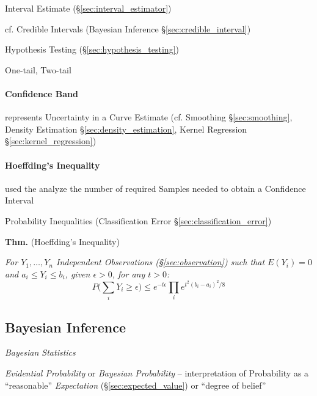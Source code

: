 Interval Estimate (\S\ref{sec:interval_estimator})

cf. Credible Intervals (Bayesian Inference \S\ref{sec:credible_interval})

Hypothesis Testing (\S\ref{sec:hypothesis_testing})

One-tail, Two-tail



\paragraph{Confidence Band}\label{sec:confidence_band}\hfill

represents Uncertainty in a Curve Estimate (cf. Smoothing \S\ref{sec:smoothing},
Density Estimation \S\ref{sec:density_estimation}, Kernel Regression
\S\ref{sec:kernel_regression})



\paragraph{Hoeffding's Inequality}\label{sec:hoeffdings_inequality}\hfill

used the analyze the number of required Samples needed to obtain a Confidence
Interval

\fist Probability Inequalities (Classification Error
\S\ref{sec:classification_error})

\textbf{Thm.} (Hoeffding's Inequality)

\emph{
  For $Y_1, \ldots, Y_n$ Independent Observations (\S\ref{sec:observation}) such
  that $E(Y_i) = 0$ and $a_i \leq Y_i \leq b_i$, given $\epsilon > 0$, for any
  $t > 0$:
  \[
    P\Big(\sum_i Y_i \geq \epsilon\Big) \leq
      e^{-t\epsilon} \prod_i e^{t^2(b_i - a_i)^2/8}
  \]
}



\subsection{Bayesian Inference}\label{sec:bayesian_inference}

\emph{Bayesian Statistics}

\emph{Evidential Probability} or \emph{Bayesian Probability} -- interpretation
of Probability as a ``reasonable'' \emph{Expectation}
(\S\ref{sec:expected_value}) or ``degree of belief''

